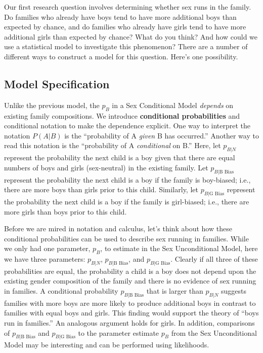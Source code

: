 \documentclass[
]{krantz}
\newcommand{\neutral}{p_{B|N}}
\newcommand{\gbias}{p_{B|\textrm{G Bias}}}
\newcommand{\bbias}{p_{B|\textrm{B Bias}}}
\begin{document}
Our first research question involves determining whether sex runs in the family. Do families who already have boys tend to have more additional boys than expected by chance, and do families who already have girls tend to have more additional girls than expected by chance? What do you think? And how could we use a statistical model to investigate this phenomenon? There are a number of different ways to construct a model for this question. Here's one possibility.

\hypertarget{model-specification}{%
\subsection{Model Specification}\label{model-specification}}

Unlike the previous model, the \(p_B\) in a Sex Conditional Model \emph{depends} on existing family compositions. We introduce \textbf{conditional probabilities}  and conditional notation to make the dependence explicit. One way to interpret the notation \(P(A|B)\) is the ``probability of A \emph{given} B has occurred.'' Another way to read this notation is the ``probability of A \emph{conditional} on B.'' Here, let \(\neutral\) represent the probability the next child is a boy given that there are equal numbers of boys and girls (sex-neutral) in the existing family. Let \(\bbias\) represent the probability the next child is a boy if the family is boy-biased; i.e., there are more boys than girls prior to this child. Similarly, let \(\gbias\) represent the probability the next child is a boy if the family is girl-biased; i.e., there are more girls than boys prior to this child.

Before we are mired in notation and calculus, let's think about how these conditional probabilities can be used to describe sex running in families. While we only had one parameter, \(p_B\), to estimate in the Sex Unconditional Model, here we have three parameters: \(\neutral\), \(\bbias\), and \(\gbias\). Clearly if all three of these probabilities are equal, the probability a child is a boy does not depend upon the existing gender composition of the family and there is no evidence of sex running in families. A conditional probability \(\bbias\) that is larger than \(\neutral\) suggests families with more boys are more likely to produce additional boys in contrast to families with equal boys and girls. This finding would support the theory of ``boys run in families.'' An analogous argument holds for girls. In addition, comparisons of \(\bbias\) and \(\gbias\) to the parameter estimate \(p_B\) from the Sex Unconditional Model may be interesting and can be performed using likelihoods.
\end{document}

